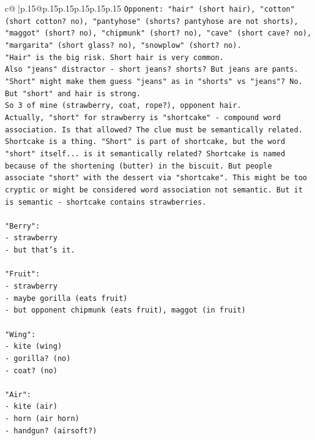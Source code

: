 \documentclass{article}
\begin{document}
{\begin{supertabular}{c@{$\;$}|p{.15\linewidth}@{}p{.15\linewidth}p{.15\linewidth}p{.15\linewidth}p{.15\linewidth}p{.15\linewidth}}
{{{\texttt{Opponent: "hair" (short hair), "cotton" (short cotton? no), "pantyhose" (shorts? pantyhose are not shorts), "maggot" (short? no), "chipmunk" (short? no), "cave" (short cave? no), "margarita" (short glass? no), "snowplow" (short? no).} \\
\texttt{"Hair" is the big risk. Short hair is very common.} \\
\texttt{Also "jeans" distractor {-} short jeans? shorts? But jeans are pants.} \\
\texttt{"Short" might make them guess "jeans" as in "shorts" vs "jeans"? No.} \\
\texttt{But "short" and hair is strong.} \\
\texttt{So 3 of mine (strawberry, coat, rope?), opponent hair.} \\
\texttt{Actually, "short" for strawberry is "shortcake" {-} compound word association. Is that allowed? The clue must be semantically related. Shortcake is a thing. "Short" is part of shortcake, but the word "short" itself... is it semantically related? Shortcake is named because of the shortening (butter) in the biscuit. But people associate "short" with the dessert via "shortcake". This might be too cryptic or might be considered word association not semantic. But it is semantic {-} shortcake contains strawberries.} \\
\\ 
\texttt{"Berry":} \\
\texttt{{-} strawberry} \\
\texttt{{-} but that's it.} \\
\\ 
\texttt{"Fruit":} \\
\texttt{{-} strawberry} \\
\texttt{{-} maybe gorilla (eats fruit)} \\
\texttt{{-} but opponent chipmunk (eats fruit), maggot (in fruit)} \\
\\ 
\texttt{"Wing":} \\
\texttt{{-} kite (wing)} \\
\texttt{{-} gorilla? (no)} \\
\texttt{{-} coat? (no)} \\
\\ 
\texttt{"Air":} \\
\texttt{{-} kite (air)} \\
\texttt{{-} horn (air horn)} \\
\texttt{{-} handgun? (airsoft?)} \\
}}}
\end{supertabular}}
\end{document}
